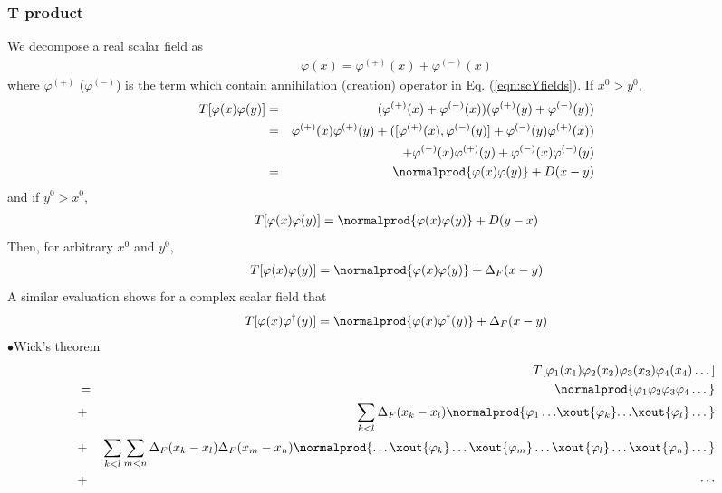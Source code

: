 \subsubsection{T product}
We decompose a real scalar field as 
\begin{eqnarray}
\varphi(x) = \varphi^{(+)}(x) + \varphi^{(-)}(x)
\end{eqnarray}
where $\varphi^{(+)}$ ($\varphi^{(-)}$) is the term which contain
annihilation (creation) operator in Eq. (\ref{eqn:scYfields}).
If $x^0 > y^0$,
\begin{eqnarray}
T[ \varphi(x) \varphi(y)]
&=& (\varphi^{(+)}(x) + \varphi^{(-)}(x))(\varphi^{(+)}(y) + \varphi^{(-)}(y))
\nonumber\\
&=&
\varphi^{(+)}(x) \varphi^{(+)}(y)
+
( [\varphi^{(+)}(x), \varphi^{(-)}(y)] 
+ \varphi^{(-)}(y) \varphi^{(+)}(x) )
\nonumber\\
&&
+
\varphi^{(-)}(x) \varphi^{(+)}(y)
+
\varphi^{(-)}(x) \varphi^{(-)}(y)
\nonumber\\
&=&
\normalprod{\varphi(x) \varphi(y)} + D(x-y)
\nonumber
\end{eqnarray}
and if $y^0 > x^0$,
\begin{eqnarray}
T[ \varphi(x) \varphi(y)]
=
\normalprod{\varphi(x) \varphi(y)} + D(y-x)
\nonumber
\end{eqnarray}
Then, for arbitrary $x^0$ and $y^0$,
\begin{eqnarray}
T[ \varphi(x) \varphi(y)]
=
\normalprod{\varphi(x) \varphi(y)} + \Delta_F(x-y)
\end{eqnarray}
A similar evaluation shows for a complex scalar field that
\begin{eqnarray}
T[ \varphi(x) \varphi^\dagger(y)]
=
\normalprod{\varphi(x) \varphi^\dagger(y)} + \Delta_F(x-y)
\end{eqnarray}
\noindent
$\bullet$Wick's theorem\\
\begin{eqnarray}
&&T[\varphi_1(x_1) \varphi_2(x_2) \varphi_3(x_3) \varphi_4(x_4) \dots]
\nonumber\\
&=& \normalprod{\varphi_1 \varphi_2 \varphi_3 \varphi_4 \dots}
\nonumber\\
&+&
\sum_{k<l} \Delta_F(x_k - x_l)
\normalprod{
{\varphi_1\dots}{\xout{\varphi_k}}{\dots}{\xout{\varphi_l}} \dots
}%
\nonumber\\
&+&
\sum_{k<l} \sum_{m<n} \Delta_F(x_k - x_l) \Delta_F(x_m - x_n)
\normalprod{\dots \xout{\varphi_k} \dots \xout{\varphi_m} \dots \xout{\varphi_l} \dots
\xout{\varphi_n} \dots}
\nonumber\\
&+& \cdots
\end{eqnarray}



